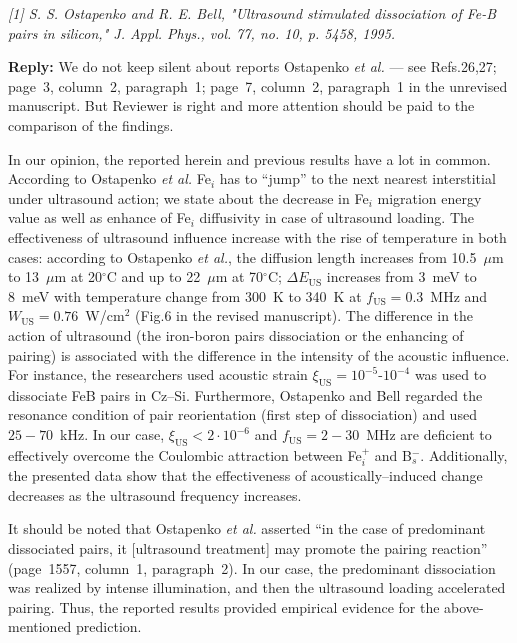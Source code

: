 \documentclass[sn-mathphys]{sn-jnl}
\begin{document}
\emph{
[1] S. S. Ostapenko and R. E. Bell, "Ultrasound stimulated dissociation of Fe-B pairs in silicon," J. Appl. Phys., vol. 77, no. 10, p. 5458, 1995.
 }

\noindent
\textcolor[rgb]{0.51,0.00,0.00}{\textbf{Reply:}}
We do not keep silent about reports Ostapenko \emph{et al.} --- see Refs.26,27;
page~3, column~2, paragraph~1; page~7, column~2, paragraph~1 in the unrevised manuscript.
But Reviewer is right and more attention should be paid to the comparison of the findings.

In our opinion,
the reported herein and previous results have a lot in common.
According to Ostapenko \emph{et al.}\cite{Ostapenko1995SST}
Fe$_i$ has to ``jump'' to the next nearest interstitial under ultrasound action;
we state about the decrease in Fe$_i$ migration energy value
as well as enhance of Fe$_i$ diffusivity
in case of ultrasound loading.
The effectiveness of ultrasound influence increase with the rise of temperature in both cases:
according to Ostapenko \emph{et al.},\cite{Ostapenko1994APL,Ostapenko1995SST}
the diffusion length increases from 10.5~$\mu$m to 13~$\mu$m at 20$^\circ$C and up to
22~$\mu$m at 70$^\circ$C;
$\Delta E_\mathrm{US}$ increases from 3~meV to 8~meV with temperature change
from 300~K to 340~K at  $f_\mathrm{US}=0.3$~MHz and $W_\mathrm{US}=0.76$~W/cm$^2$
(Fig.6 in the revised manuscript).
The difference in the action of ultrasound
(the iron-boron pairs dissociation or the enhancing of pairing)
is associated with the difference in the intensity of the acoustic influence.
For instance, the researchers used acoustic strain $\xi_\mathrm{US}=10^{-5}$-$10^{-4}$
was used\cite{Ostapenko1995}
to dissociate FeB pairs in Cz--Si.
Furthermore,
Ostapenko and Bell\cite{Ostapenko1995} regarded the resonance condition of
pair reorientation (first step of dissociation) and used $25-70$~kHz.
In our case,  $\xi_\mathrm{US}<2\cdot10^{-6}$ and $f_\mathrm{US}=2-30$~MHz are deficient to effectively overcome the Coulombic attraction between Fe$_i^+$ and B$_s^-$.
Additionally, the presented data show that the effectiveness of acoustically--induced change
decreases as the ultrasound frequency increases.

It should be noted that Ostapenko \emph{et al.}\cite{Ostapenko1994APL} asserted
``in the  case  of predominant  dissociated  pairs,  it [ultrasound treatment] may promote  the
pairing reaction'' (page~1557, column~1, paragraph~2).
In our case, the predominant  dissociation was realized by intense illumination, and then
the ultrasound loading accelerated pairing.
Thus, the reported results provided empirical evidence  for the above-mentioned prediction.
\end{document}
